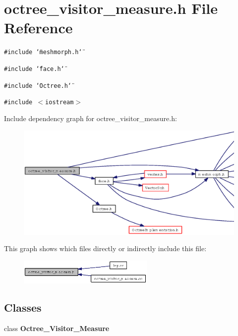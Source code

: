 \section{octree\_\-visitor\_\-measure.h File Reference}
\label{octree__visitor__measure_8h}
{\tt \#include \char`\"{}meshmorph.h\char`\"{}}\par
{\tt \#include \char`\"{}face.h\char`\"{}}\par
{\tt \#include \char`\"{}Octree.h\char`\"{}}\par
{\tt \#include $<$iostream$>$}\par


Include dependency graph for octree\_\-visitor\_\-measure.h:\begin{figure}[H]
\begin{center}
\leavevmode
\includegraphics[width=354pt]{octree__visitor__measure_8h__incl}
\end{center}
\end{figure}


This graph shows which files directly or indirectly include this file:\begin{figure}[H]
\begin{center}
\leavevmode
\includegraphics[width=186pt]{octree__visitor__measure_8h__dep__incl}
\end{center}
\end{figure}
\subsection*{Classes}
\begin{CompactItemize}
\item 
class {\bf Octree\_\-Visitor\_\-Measure}
\end{CompactItemize}
